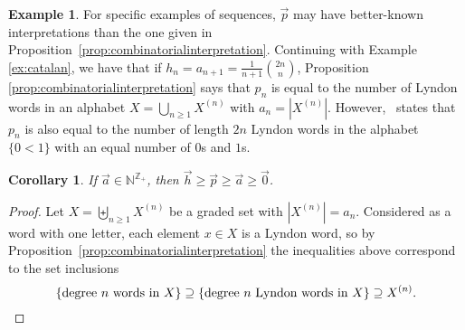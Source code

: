 \documentclass[11pt]{amsart}
\newtheorem{corollary}[theorem]{Corollary}
\theoremstyle{definition}
\newtheorem{example}[theorem]{Example}
\numberwithin{equation}{section}
\def\NN{{\mathbb N}}
\def\ZZ{{\mathbb Z}}
\newcommand{\mike}[1]{\todo[size=\tiny,color=green!30]{#1 \\ \hfill --- Mike}}
\newcommand{\lucas}[1]{\todo[size=\tiny,color=red!50]{#1 \\ \hfill --- Lucas}}
\begin{document}
\begin{example}\label{ex:balancedLyndon}
For specific examples of sequences,
$\vec{p}$ may have better-known interpretations
than the one given in  Proposition~\ref{prop:combinatorialinterpretation}.
Continuing with Example \ref{ex:catalan}, we have that if
$h_n = a_{n+1} = \frac{1}{n+1}\binom{2n}{n}$, Proposition
\ref{prop:combinatorialinterpretation} says that $p_n$ is equal to the number
of Lyndon words in an alphabet $X = \bigcup_{n\geq1} X^{(n)}$ with $a_n = |X^{(n)}|$.
However,~\cite[A022553]{OEIS} states that $p_n$ is also equal to the number of
length $2n$ Lyndon words in the alphabet $\{0 < 1\}$ with an equal number of $0$s and $1$s.
%
%
\end{example}

\begin{corollary}
If $\vec{a} \in \NN^{\ZZ_+}$, then $\vec{h} \geq \vec{p} \geq \vec{a} \geq \vec{0}$.
\end{corollary}
\begin{proof}
Let $X = \biguplus_{n \ge 1} X^{(n)}$ be a graded set with $|X^{(n)}| = a_{n}$.  
Considered as a word with one letter, each element $x \in X$ is a Lyndon word, so by Proposition~\ref{prop:combinatorialinterpretation} the inequalities above correspond to the set inclusions
\[
\{\text{degree $n$ words in $X$}\} 
\supseteq \{\text{degree $n$ Lyndon words in $X$}\} 
\supseteq X^{(n)}. \qedhere
\]
\end{proof}
\end{document}
